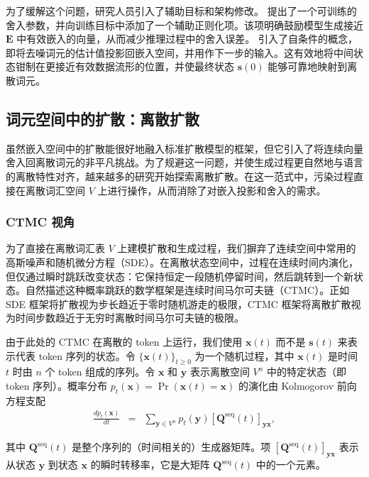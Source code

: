 为了缓解这个问题，研究人员引入了辅助目标和架构修改。\citet{li-etal:2022diffusion} 提出了一个可训练的舍入参数，并向训练目标中添加了一个辅助正则化项。该项明确鼓励模型生成接近 $\mathbf{E}$ 中有效嵌入的向量，从而减少推理过程中的舍入误差。\citet{strudel-etal:2022self} 引入了自条件的概念，即将去噪词元的估计值投影回嵌入空间，并用作下一步的输入。这有效地将中间状态钳制在更接近有效数据流形的位置，并使最终状态 $\mathbf{s}(0)$ 能够可靠地映射到离散词元。
\subsection{词元空间中的扩散：离散扩散}

虽然嵌入空间中的扩散能很好地融入标准扩散模型的框架，但它引入了将连续向量舍入回离散词元的非平凡挑战。为了规避这一问题，并使生成过程更自然地与语言的离散特性对齐，越来越多的研究开始探索离散扩散。在这一范式中，污染过程直接在离散词汇空间 $V$ 上进行操作，从而消除了对嵌入投影和舍入的需求。
\subsubsection{CTMC 视角}
\label{sec:the-ctmc-perspective}

为了直接在离散词汇表 $V$ 上建模扩散和生成过程，我们摒弃了连续空间中常用的高斯噪声和随机微分方程（SDE）。在离散状态空间中，过程在连续时间内演化，但仅通过瞬时跳跃改变状态：它保持恒定一段随机停留时间，然后跳转到一个新状态。自然描述这种概率跳跃的数学框架是连续时间马尔可夫链（CTMC）。正如 SDE 框架将扩散视为步长趋近于零时随机游走的极限，CTMC 框架将离散扩散视为时间步数趋近于无穷时离散时间马尔可夫链的极限。

由于此处的 CTMC 在离散的 token 上运行，我们使用 $\mathbf{x}(t)$ 而不是 $\mathbf{s}(t)$ 来表示代表 token 序列的状态。令 $\{\mathbf{x}(t)\}_{t \ge 0}$ 为一个随机过程，其中 $\mathbf{x}(t)$ 是时间 $t$ 时由 $n$ 个 token 组成的序列。令 $\mathbf{x}$ 和 $\mathbf{y}$ 表示离散空间 $V^n$ 中的特定状态（即 token 序列）。概率分布 $p_t(\mathbf{x}) = \Pr(\mathbf{x}(t)=\mathbf{x})$ 的演化由 Kolmogorov 前向方程支配
\begin{eqnarray}
\frac{d p_t(\mathbf{x})}{dt} & = & \sum_{\mathbf{y} \in V^n} p_t(\mathbf{y}) [\mathbf{Q}^{\mathrm{seq}}(t)]_{\mathbf{y}\mathbf{x}}, \label{eq:ctmc-equation}
\end{eqnarray}

\noindent 其中 $\mathbf{Q}^{\mathrm{seq}}(t)$ 是整个序列的（时间相关的）生成器矩阵。项 $[\mathbf{Q}^{\mathrm{seq}}(t)]_{\mathbf{y}\mathbf{x}}$ 表示从状态 $\mathbf{y}$ 到状态 $\mathbf{x}$ 的瞬时转移率，它是大矩阵 $\mathbf{Q}^{\mathrm{seq}}(t)$ 中的一个元素。

